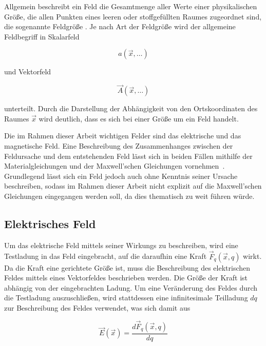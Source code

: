 
Allgemein beschreibt ein Feld die Gesamtmenge aller Werte einer physikalischen Größe, die allen Punkten eines leeren oder stoffgefüllten Raumes zugeordnet sind, die sogenannte Feldgröße \cite{Spektrum.de_Feld}. Je nach Art der Feldgröße wird der allgemeine Feldbegriff in Skalarfeld 

\begin{equation}
    a(\vec x, \ldots)    
\end{equation}


und Vektorfeld 

\begin{equation}
    \vec A(\vec x,\ldots)
\end{equation}

unterteilt. Durch die Darstellung der Abhängigkeit von den Ortskoordinaten des Raumes $\vec x$ wird deutlich, dass es sich bei einer Größe um ein Feld handelt. \par
\vspace{\linespace}
Die im Rahmen dieser Arbeit wichtigen Felder sind das elektrische und das magnetische Feld. Eine Beschreibung des Zusammenhanges zwischen der Feldursache und dem entstehenden Feld lässt sich in beiden Fällen mithilfe der Materialgleichungen und der Maxwell'schen Gleichungen vornehmen~\cite{EM_Schirmung}. Grundlegend lässt sich ein Feld jedoch auch ohne Kenntnis seiner Ursache beschreiben, sodass im Rahmen dieser Arbeit nicht explizit auf die Maxwell'schen Gleichungen eingegangen werden soll, da dies thematisch zu weit führen würde. 


\subsection{Elektrisches Feld}\label{cha:2_sub_Elektrisches_Feld}

Um das elektrische Feld mittels seiner Wirkungs zu beschreiben, wird eine Testladung in das Feld eingebracht, auf die daraufhin eine Kraft $\vec F_q(\vec x,q)$ wirkt. Da die Kraft eine gerichtete Größe ist, muss die Beschreibung des elektrischen Feldes mittels eines Vektorfeldes beschrieben werden. Die Größe der Kraft ist abhängig von der eingebrachten Ladung. Um eine Veränderung des Feldes durch die Testladung auszuschließen, wird stattdessen eine infinitesimale Teilladung $dq$ zur Beschreibung des Feldes verwendet, was sich damit aus

\begin{equation}
    \vec E (\vec x) = \frac{d\vec F_q(\vec x,q)}{dq}
\end{equation}

